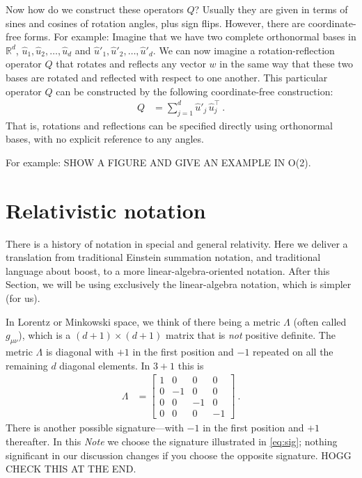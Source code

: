 \documentclass{article}
\newcommand{\documentname}{\textsl{Note}}
\begin{document}
Now how do we construct these operators $Q$?
Usually they are given in terms of sines and cosines of rotation angles, plus sign flips.
However, there are coordinate-free forms.
For example: Imagine that we have two complete orthonormal bases in $\mathbb{R}^d$, $\hat{u}_1,\hat{u}_2,\ldots,\hat{u}_d$ and $\hat{u}'_1,\hat{u}'_2,\ldots,\hat{u}'_d$.
We can now imagine a rotation-reflection operator $Q$ that rotates and reflects any vector $w$ in the same way that these two bases are rotated and reflected with respect to one another.
This particular operator $Q$ can be constructed by the following coordinate-free construction:
\begin{align}
    Q &= \sum_{j=1}^d \hat{u}'_j\,\hat{u}_j^\top ~.
\end{align}
That is, rotations and reflections can be specified directly using orthonormal bases, with no explicit reference to any angles.

For example: SHOW A FIGURE AND GIVE AN EXAMPLE IN O(2).

\section{Relativistic notation}\label{sec:notation}

There is a history of notation in special and general relativity.
Here we deliver a translation from traditional Einstein summation notation, and traditional language about boost, to a more linear-algebra-oriented notation.
After this Section, we will be using exclusively the linear-algebra notation, which is simpler (for us).

In Lorentz or Minkowski space, we think of there being a metric $\Lambda$ (often called $g_{\mu\nu}$), which is a $(d+1)\times(d+1)$ matrix that is \emph{not} positive definite.
The metric $\Lambda$ is diagonal with $+1$ in the first position and $-1$ repeated on all the remaining $d$ diagonal elements.
In $3+1$ this is
\begin{align}\label{eq:sig}
    \Lambda &= \begin{bmatrix}1 & 0 & 0 & 0\\
                              0 & -1 & 0 & 0\\
                              0 & 0 & -1 & 0\\
                              0 & 0 & 0 & -1\end{bmatrix} ~.
\end{align}
There is another possible signature---with $-1$ in the first position and $+1$ thereafter.
In this \documentname{} we choose the signature illustrated in \eqref{eq:sig}; nothing significant in our discussion changes if you choose the opposite signature. HOGG CHECK THIS AT THE END.
\end{document}
